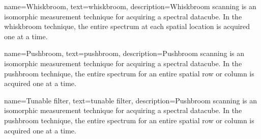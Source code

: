 {
name={Whiskbroom},
text={whiskbroom},
description={Whiskbroom scanning is an isomorphic measurement technique for acquiring a spectral datacube. In the whiskbroom technique, the entire spectrum at each spatial location is acquired one at a time.}
}

{
name={Pushbroom},
text={pushbroom},
description={Pushbroom scanning is an isomorphic measurement technique for acquiring a spectral datacube. In the pushbroom technique, the entire spectrum for an entire spatial row or column is acquired one at a time.}
}


{
name={Tunable filter},
text={tunable filter},
description={Pushbroom scanning is an isomorphic measurement technique for acquiring a spectral datacube. In the pushbroom technique, the entire spectrum for an entire spatial row or column is acquired one at a time.}
}